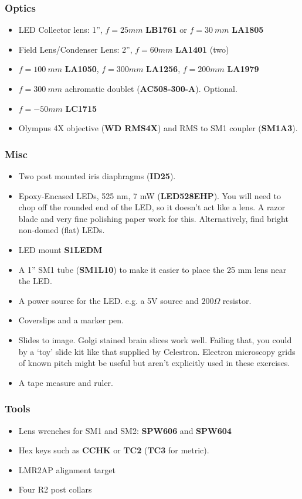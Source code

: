 \documentclass[a4paper]{report}
\begin{document}
\subsubsection{Optics}
\begin{itemize}
\setlength\itemsep{0.1em}
\item LED Collector lens: 1'', $f=25 mm$ \textbf{LB1761} or $f=30~mm$ \textbf{LA1805}
\item Field Lens/Condenser Lens: 2'', $f=60 mm$ \textbf{LA1401} (two)
\item $f=100~mm$ \textbf{LA1050}, $f=300 mm$ \textbf{LA1256}, $f=200 mm$ \textbf{LA1979}
\item $f=300~mm$ achromatic doublet (\textbf{AC508-300-A}). Optional.
\item $f=-50 mm$ \textbf{LC1715}
\item Olympus 4X objective (\textbf{WD RMS4X}) and RMS to SM1 coupler (\textbf{SM1A3}).
\end{itemize}

\subsubsection{Misc}
\begin{itemize}
\setlength\itemsep{0.1em}
\item Two post mounted iris diaphragms (\textbf{ID25}). 
\item Epoxy-Encased LEDs, 525 nm, 7 mW (\textbf{LED528EHP}).
You will need to chop off the rounded end of the LED, so it doesn't act like a lens.  
A razor blade and very fine polishing paper work for this. Alternatively, find bright non-domed (flat) LEDs.
\item LED mount \textbf{S1LEDM}
\item A 1'' SM1 tube (\textbf{SM1L10}) to make it easier to place the 25 mm lens near the LED.
\item A power source for the LED. e.g. a 5V source and $200\Omega$ resistor. 
\item Coverslips and a marker pen.
\item Slides to image. Golgi stained brain slices work well. 
Failing that, you could by a `toy' slide kit like that supplied by Celestron. 
Electron microscopy grids of known pitch might be useful but aren't explicitly used in these exercises.
\item A tape measure and ruler. 
\end{itemize}

\subsubsection{Tools}
\begin{itemize}
\setlength\itemsep{0.1em}
\item Lens wrenches for SM1 and SM2: \textbf{SPW606} and \textbf{SPW604}
\item Hex keys such as \textbf{CCHK} or \textbf{TC2} (\textbf{TC3} for metric). 
\item LMR2AP alignment target
\item Four R2 post collars
\end{itemize}
\end{document}
